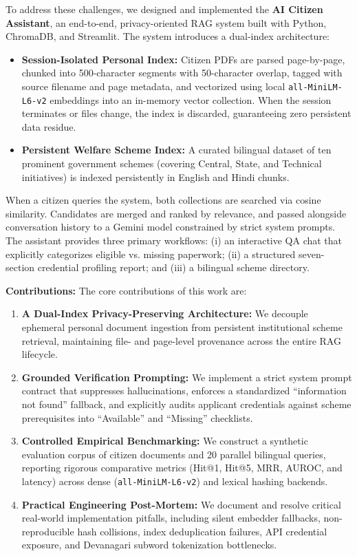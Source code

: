 \documentclass[conference]{IEEEtran}
\begin{document}
To address these challenges, we designed and implemented the \textbf{AI Citizen Assistant}, an end-to-end, privacy-oriented RAG system built with Python, ChromaDB, and Streamlit. The system introduces a dual-index architecture:
\begin{itemize}
    \item \textbf{Session-Isolated Personal Index:} Citizen PDFs are parsed page-by-page, chunked into 500-character segments with 50-character overlap, tagged with source filename and page metadata, and vectorized using local \texttt{all-MiniLM-L6-v2} embeddings into an in-memory vector collection. When the session terminates or files change, the index is discarded, guaranteeing zero persistent data residue.
    \item \textbf{Persistent Welfare Scheme Index:} A curated bilingual dataset of ten prominent government schemes (covering Central, State, and Technical initiatives) is indexed persistently in English and Hindi chunks.
\end{itemize}

When a citizen queries the system, both collections are searched via cosine similarity. Candidates are merged and ranked by relevance, and passed alongside conversation history to a Gemini model constrained by strict system prompts. The assistant provides three primary workflows: (i) an interactive QA chat that explicitly categorizes eligible vs. missing paperwork; (ii) a structured seven-section credential profiling report; and (iii) a bilingual scheme directory.

\textbf{Contributions:} The core contributions of this work are:
\begin{enumerate}
    \item \textbf{A Dual-Index Privacy-Preserving Architecture:} We decouple ephemeral personal document ingestion from persistent institutional scheme retrieval, maintaining file- and page-level provenance across the entire RAG lifecycle.
    \item \textbf{Grounded Verification Prompting:} We implement a strict system prompt contract that suppresses hallucinations, enforces a standardized ``information not found'' fallback, and explicitly audits applicant credentials against scheme prerequisites into ``Available'' and ``Missing'' checklists.
    \item \textbf{Controlled Empirical Benchmarking:} We construct a synthetic evaluation corpus of citizen documents and 20 parallel bilingual queries, reporting rigorous comparative metrics (Hit@1, Hit@5, MRR, AUROC, and latency) across dense (\texttt{all-MiniLM-L6-v2}) and lexical hashing backends.
    \item \textbf{Practical Engineering Post-Mortem:} We document and resolve critical real-world implementation pitfalls, including silent embedder fallbacks, non-reproducible hash collisions, index deduplication failures, API credential exposure, and Devanagari subword tokenization bottlenecks.
\end{enumerate}
\end{document}
